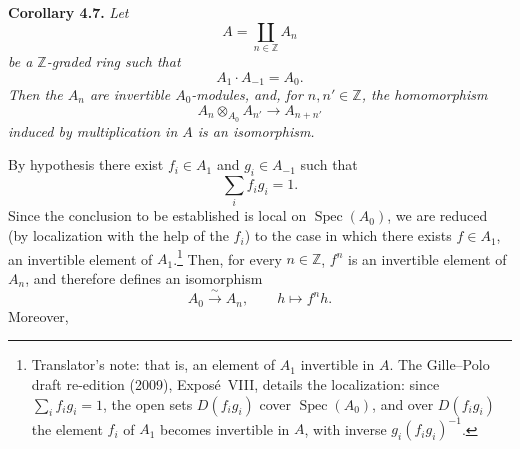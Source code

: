 \medskip
\noindent{}\textbf{Corollary 4.7.}
\textit{Let}
\[
  A=\coprod_{n\in\mathbb Z}A_n
\]
\textit{be a \(\mathbb Z\)-graded ring such that}
\[
  A_1\mathbin{\cdot}A_{-1}=A_0.
\]
\textit{Then the \(A_n\) are invertible \(A_0\)-modules, and, for
\(n,n'\in\mathbb Z\), the homomorphism}
\[
  A_n\otimes_{A_0}A_{n'}\longrightarrow A_{n+n'}
\]
\textit{induced by multiplication in \(A\) is an isomorphism.}

By hypothesis there exist \(f_i\in A_1\) and \(g_i\in A_{-1}\) such that
\[
  \sum_i f_ig_i=1.
\]
Since the conclusion to be established is local on
\(\operatorname{Spec}(A_0)\), we are reduced (by localization with the
help of the \(f_i\)) to the case in which there exists \(f\in A_1\), an
invertible element of \(A_1\).\footnote{Translator's note: that is, an element of \(A_1\)
invertible in \(A\). The Gille--Polo draft re-edition (2009), Expos\'e~VIII, details the
localization: since \(\sum_if_ig_i=1\), the open sets \(D(f_ig_i)\) cover \(\operatorname{Spec}(A_0)\),
and over \(D(f_ig_i)\) the element \(f_i\) of \(A_1\) becomes invertible in \(A\), with inverse
\(g_i(f_ig_i)^{-1}\).} Then, for every
\(n\in\mathbb Z\), \(f^n\) is an invertible element of \(A_n\), and
therefore defines an isomorphism
\[
  A_0\xrightarrow{\ \sim\ }A_n,
  \qquad h\longmapsto f^nh.
\]
Moreover,
